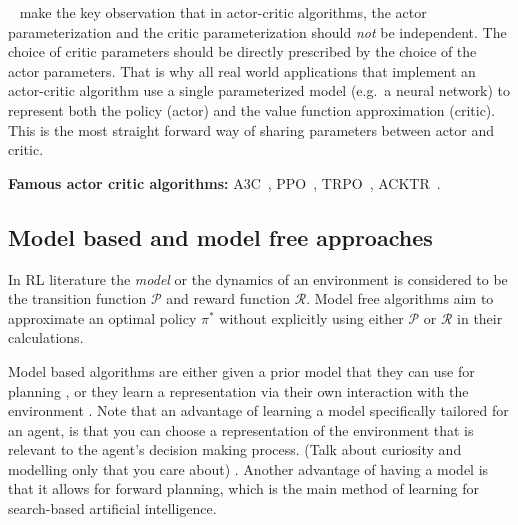 \documentclass{../main.tex}{}
\begin{document}
~\cite{Konda2000} make the key observation that in actor-critic algorithms, the actor parameterization and the critic parameterization should \textit{not} be independent. The choice of critic parameters should be directly prescribed by the choice of the actor parameters. That is why all real world applications that implement an actor-critic algorithm use a single parameterized model (e.g.\ a neural network) to represent both the policy (actor) and the value function approximation (critic). This is the most straight forward way of sharing parameters between actor and critic.

\textbf{Famous actor critic algorithms:} A3C~\citep{Mnih2016}, PPO~\citep{Schulman2017}, TRPO~\citep{Schulman2015}, ACKTR~\citep{Wu2017}.

\subsection{Model based and model free approaches}
In RL literature the \textit{model} or the dynamics of an environment is considered to be the transition function $\mathcal{P}$ and reward function $\mathcal{R}$. Model free algorithms aim to approximate an optimal policy $\pi^*$ without explicitly using either $\mathcal{P}$ or $\mathcal{R}$ in their calculations.

Model based algorithms are either given a prior model that they can use for planning \citep{browne2012survey, Soemers2014}, or they learn a representation via their own interaction with the environment \citep{Sutton1991, Guzdial2017, Deisenroth2011}. Note that an advantage of learning a model specifically tailored for an agent, is that you can choose a representation of the environment that is relevant to the agent's decision making process. (Talk about curiosity and modelling only that you care about) \citep{Pathak2017}. Another advantage of having a model is that it allows for forward planning, which is the main method of learning for search-based artificial intelligence.
\end{document}
